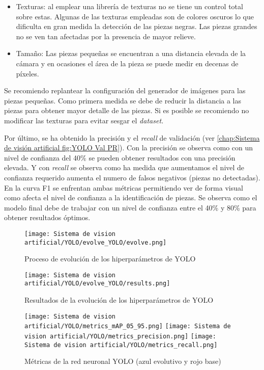\begin{itemize}
\item Texturas: al emplear una librería de texturas no se tiene un control total sobre estas. Algunas de las texturas empleadas son de colores oscuros lo que dificulta en gran medida la detección de las piezas negras. Las piezas grandes no se ven tan afectadas por la presencia de mayor relieve.
\item Tamaño: Las piezas pequeñas se encuentran a una distancia elevada de la cámara y en ocasiones el área de la pieza se puede medir en decenas de píxeles.
\end{itemize}

Se recomiendo replantear la configuración del generador de imágenes para las piezas pequeñas. Como primera medida se debe de reducir la distancia a las piezas para obtener mayor detalle de las piezas. Si es posible se recomiendo no modificar las texturas para evitar sesgar el \textit{dataset.}

Por último, se ha obtenido la precisión y el \textit{recall} de validación (ver \autoref{chap:Sistema de visión artificial fig:YOLO Val PR}). Con la precisión se observa como con un nivel de confianza del 40\% se pueden obtener resultados con una precisión elevada. Y con \textit{recall} se observa como ha medida que aumentamos el nivel de confianza requerido aumenta el numero de falsos negativos (piezas no detectadas). En la curva F1 se enfrentan ambas métricas permitiendo ver de forma visual como afecta el nivel de confianza a la identificación de piezas. Se observa como el modelo final debe de trabajar con un nivel de confianza entre el 40\% y 80\% para obtener resultados óptimos.

\begin{figure}[H]
	\centering
	\texttt{[image: Sistema de vision artificial/YOLO/evolve\_YOLO/evolve.png]}
	\caption{Proceso de evolución de los hiperparámetros de YOLO}
	\label{chap:Sistema de visión artificial fig:Evolución YOLO}
\end{figure}

\begin{figure}[H]
	\centering
	\texttt{[image: Sistema de vision artificial/YOLO/evolve\_YOLO/results.png]}
	\caption{Resultados de la evolución de los hiperparámetros de YOLO}
	\label{chap:Sistema de visión artificial fig:Resultados evolución YOLO}
\end{figure}

\begin{figure}[H]
	\centering
    \texttt{[image: Sistema de vision artificial/YOLO/metrics\_mAP\_05\_95.png]} \hfill
    \texttt{[image: Sistema de vision artificial/YOLO/metrics\_precision.png]} \hfill
    \texttt{[image: Sistema de vision artificial/YOLO/metrics\_recall.png]}
	\caption[Métricas de la red neuronal YOLO \textit{(mAP 0.5:0.95, precision \& recall)}]{Métricas de la red neuronal YOLO (azul evolutivo y rojo base)}
	\label{chap:Sistema de visión artificial fig:YOLO metrics}
\end{figure}

